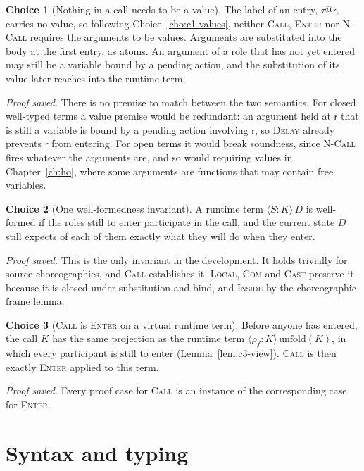 \documentclass[11pt]{report}
\makeatletter
\theoremstyle{plain}
\theoremstyle{definition}
\newtheorem{choice}{Choice}[chapter]
\theoremstyle{remark}
\newcommand{\rr}{\mathsf{r}}
\newcommand{\rt}[3]{\langle #1 : #2\rangle\,#3}
\newcommand{\unfold}[1]{\mathrm{unfold}(#1)}
\newcommand{\tauat}[1]{\tau\mathord{@}#1}
\newcommand{\rn}[1]{{\normalfont\scshape #1}}
\makeatother
\begin{document}
\begin{choice}[Nothing in a call needs to be a value]\label{cho:c3-novalue}
  The label of an entry, $\tauat{\rr}$, carries no value, so following
  Choice~\ref{cho:c1-values}, neither \rn{Call}, \rn{Enter} nor \rn{N-Call}
  requires the arguments to be values.  Arguments are substituted into the
  body at the first entry, as atoms.  An argument of a role that has not yet
  entered may still be a variable bound by a pending action, and the
  substitution of its value later reaches into the runtime term.

  \emph{Proof saved.}  There is no premise to match between the two
  semantics.  For closed well-typed terms a value premise would be
  redundant: an argument held at $\rr$ that is still a variable is bound by a
  pending action involving $\rr$, so \rn{Delay} already prevents $\rr$ from
  entering.  For open terms it would break soundness, since \rn{N-Call}
  fires whatever the arguments are, and so would requiring values in
  Chapter~\ref{ch:ho}, where some arguments are functions that may contain
  free variables.
\end{choice}

\begin{choice}[One well-formedness invariant]\label{cho:c3-wf}
  A runtime term $\rt{S}{K}{D}$ is well-formed if the roles still to enter
  participate in the call, and the current state $D$ still expects of each
  of them exactly what they will do when they enter.

  \emph{Proof saved.}  This is the only invariant in the development.  It
  holds trivially for source choreographies, and \rn{Call} establishes it.
  \rn{Local}, \rn{Com} and \rn{Cast} preserve it because it is closed under
  substitution and bind, and \rn{Inside} by the choreographic frame lemma.
\end{choice}

\begin{choice}[\rn{Call} is \rn{Enter} on a virtual runtime term]\label{cho:c3-view}
  Before anyone has entered, the call $K$ has the same projection as the
  runtime term $\rt{\rho_f}{K}{\unfold{K}}$, in which every participant is
  still to enter (Lemma~\ref{lem:c3-view}).  \rn{Call} is then exactly
  \rn{Enter} applied to this term.

  \emph{Proof saved.}  Every proof case for \rn{Call} is an instance of the
  corresponding case for \rn{Enter}.
\end{choice}

\section{Syntax and typing}
\label{sec:c3-syntax}
\end{document}
